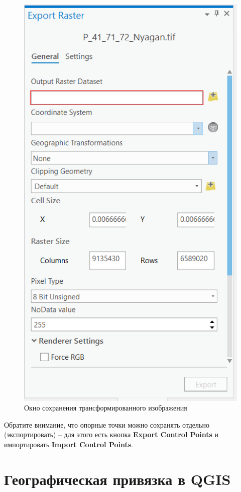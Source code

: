 \documentclass[
  12pt,
]{book}
\begin{document}
\begin{figure}
\centering
\includegraphics{images/Ref02/Arc_export_raster.png}
\caption{Окно сохранения трансформированного изображения}
\end{figure}

Обратите внимание, что опорные точки можно сохранять отдельно (экспортировать) -- для этого есть кнопка \textbf{Export Control Points} и импортировать \textbf{Import Control Points}.

\hypertarget{georeference-qgis}{%
\section{Географическая привязка в QGIS}\label{georeference-qgis}}
\end{document}
